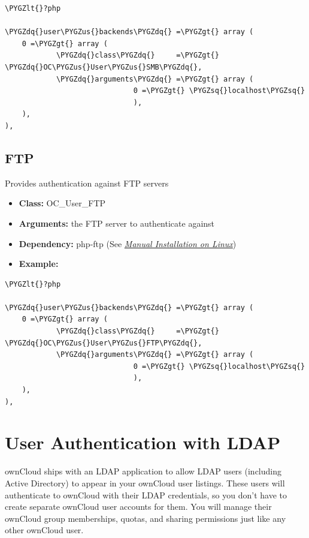\documentclass[letterpaper,10pt,english]{sphinxmanual}
\def\PYGZus{\char`\_}
\def\PYGZlt{\char`\<}
\def\PYGZgt{\char`\>}
\def\PYGZsq{\char`\'}
\def\PYGZdq{\char`\"}
\renewcommand\PYGZsq{\textquotesingle}
\begin{document}
\begin{Verbatim}[commandchars=\\\{\}]
\PYGZlt{}?php

\PYGZdq{}user\PYGZus{}backends\PYGZdq{} =\PYGZgt{} array (
    0 =\PYGZgt{} array (
            \PYGZdq{}class\PYGZdq{}     =\PYGZgt{} \PYGZdq{}OC\PYGZus{}User\PYGZus{}SMB\PYGZdq{},
            \PYGZdq{}arguments\PYGZdq{} =\PYGZgt{} array (
                              0 =\PYGZgt{} \PYGZsq{}localhost\PYGZsq{}
                              ),
    ),
),
\end{Verbatim}


\subsection{FTP}
\label{configuration_user/user_auth_ftp_smb_imap:ftp}
Provides authentication against FTP servers
\begin{itemize}
\item {} 
\textbf{Class:} OC\_User\_FTP

\item {} 
\textbf{Arguments:} the FTP server to authenticate against

\item {} 
\textbf{Dependency:} php-ftp (See {\hyperref[installation/source_installation::doc]{\emph{\emph{Manual Installation on Linux}}}})

\item {} 
\textbf{Example:}

\end{itemize}

\begin{Verbatim}[commandchars=\\\{\}]
\PYGZlt{}?php

\PYGZdq{}user\PYGZus{}backends\PYGZdq{} =\PYGZgt{} array (
    0 =\PYGZgt{} array (
            \PYGZdq{}class\PYGZdq{}     =\PYGZgt{} \PYGZdq{}OC\PYGZus{}User\PYGZus{}FTP\PYGZdq{},
            \PYGZdq{}arguments\PYGZdq{} =\PYGZgt{} array (
                              0 =\PYGZgt{} \PYGZsq{}localhost\PYGZsq{}
                              ),
    ),
),
\end{Verbatim}


\section{User Authentication with LDAP}
\label{configuration_user/user_auth_ldap::doc}\label{configuration_user/user_auth_ldap:user-authentication-with-ldap}
ownCloud ships with an LDAP application to allow LDAP users (including Active
Directory) to appear in your ownCloud user listings. These users will
authenticate to ownCloud with their LDAP credentials, so you don't have to
create separate ownCloud user accounts for them. You will manage their ownCloud
group memberships, quotas, and sharing permissions just like any other ownCloud
user.
\end{document}
